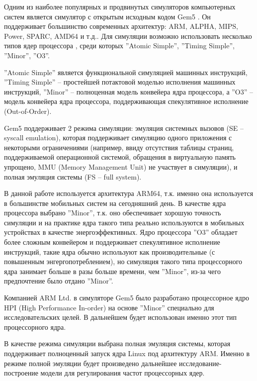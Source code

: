     Одним из наиболее популярных и продвинутых симуляторов компьютерных систем является симулятор
    с открытым исходным кодом Gem5 \cite{binkert2011gem5}. Он поддерживает большинство современных
    архитектур: ARM, ALPHA, MIPS, Power, SPARC, AMD64 и т.д.. Для симуляции возможно использовать
    несколько типов ядер процессора \cite{gem52017ArchExpl}, среди которых ''Atomic Simple'',
    ''Timing Simple'', ''Minor'', ''O3''.

    ''Atomic Simple'' является функциональной симуляцией
    машинных инструкций, ''Timing Simple'' -- простейшей потактовой моделью исполнения машинных
    инструкций, ''Minor'' -- полноценная модель конвейера ядра процессора,
    а ''O3'' -- модель конвейера ядра процессора, поддерживающая спекулятивное исполнение (Out-of-Order).

    Gem5 поддерживает 2 режима симуляции: эмуляция системных вызовов (SE -- syscall emulation), которая
    поддерживает симуляцию одного приложения с некоторыми ограничениями (например, ввиду отсутствия таблицы
    страниц, поддерживаемой операционной системой, обращения в виртуальную память упрощено, MMU (Memory
    Management Unit) не участвует в симуляции), и полная эмуляция системы (FS -- full system).

    В данной работе используется архитектура ARM64, т.к. именно она используется в большинстве мобильных
    систем на сегодняшний день. В качестве ядра процессора выбрано ''Minor'', т.к. оно обеспечивает
    хорошую точность симуляции и на практике ядра такого типа реально используются в мобильных
    устройствах в качестве энергоэффективных. Ядро процессора ''O3'' обладает более сложным конвейером и
    поддерживает спекулятивное исполнение инструкций, такие ядра обычно используют как производительные
    (с повышенным энгергопотреблением), но симуляция такого типа процессорного ядра занимает больше
    в разы больше времени, чем ''Minor'', из-за чего предпочтение было отдано ''Minor''.

    Компанией ARM Ltd. в симуляторе Gem5 было разработано процессорное ядро HPI (High Performance In-order)
    \cite{gem52017HPI} на основе ''Minor'' специально для исследовательских целей. В дальнейшем
    будет использован именно этот тип процессорного ядра.

    В качестве режима симуляции выбрана полная эмуляция системы, которая поддерживает полноценный запуск
    ядра Linux под архитектуру ARM. Именно в режиме полной эмуляции будет произведено дальнейшее
    исследование-построение модели для регулирования частот процессорных ядер.

\newpage

